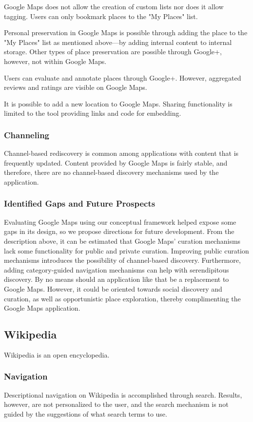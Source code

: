 {{{Google Maps does not allow the creation of custom lists nor does it allow tagging. Users can only bookmark places to the "My Places" list. 

Personal preservation in Google Maps is possible through adding the place to the "My Places" list as mentioned above---by adding internal content to internal storage. Other types of place preservation are possible through Google+, however, not within Google Maps.

Users can evaluate and annotate places through Google+. However, aggregated reviews and ratings are visible on Google Maps. 

It is possible to add a new location to Google Maps. Sharing functionality is limited to the tool providing links and code for embedding.  }
{\subsubsection{Channeling}
Channel-based rediscovery is common among applications with content that is frequently updated. Content provided by Google Maps is fairly stable, and therefore, there are no channel-based discovery mechanisms used by the application.
}%
{\subsubsection{Identified Gaps and Future Prospects}
Evaluating Google Maps using our conceptual framework helped expose some gaps in its design, so we propose directions for future development. From the description above, it can be estimated that Google Maps' curation mechanisms lack some functionality for public and private curation. Improving public curation mechanisms introduces the possibility of channel-based discovery. Furthermore, adding category-guided navigation mechanisms can help with serendipitous discovery. By no means should an application like that be a replacement to Google Maps. However, it could be oriented towards social discovery and curation, as well as opportunistic place exploration, thereby complimenting the Google Maps application.  
}%
} %

{\subsection{Wikipedia}
Wikipedia is an open encyclopedia.

{\subsubsection{Navigation}
Descriptional navigation on Wikipedia is accomplished through search. Results, however, are not personalized to the user, and the search mechanism is not guided by the suggestions of what search terms to use.

}}}
